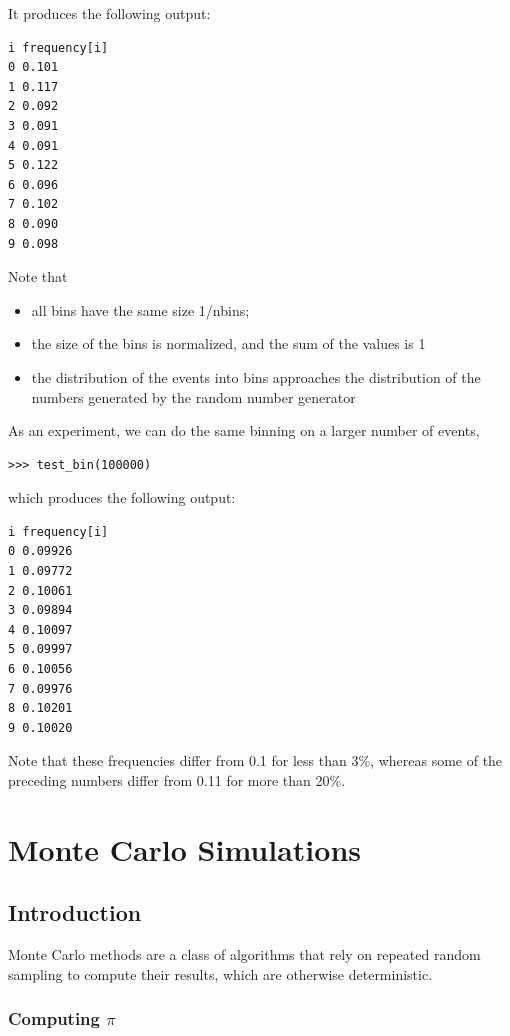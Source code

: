 \documentclass[justified, sixbynine]{tufte-book}
\theoremstyle{plain}%
\newtheorem * {corollary}{Corollary}
\theoremstyle{definition}
\theoremstyle{remark}
\newtheorem * {remark}{Remark}
\newtheorem * {note}{Note}
\begin{document}
\begin{fullwidth}
It produces the following output:
\begin{lstlisting}
i frequency[i]
0 0.101
1 0.117
2 0.092
3 0.091
4 0.091
5 0.122
6 0.096
7 0.102
8 0.090
9 0.098
\end{lstlisting}

Note that

\begin{itemize}
\item  all bins have the same size 1/nbins;

\item  the size of the bins is normalized, and the sum of the values is 1

\item  the distribution of the events into bins approaches the distribution
of the numbers generated by the random number generator
\end{itemize}

As an experiment, we can do the same binning on a larger number of events,
\begin{lstlisting}
>>> test_bin(100000)
\end{lstlisting}

which produces the following output:
\begin{lstlisting}
i frequency[i]
0 0.09926
1 0.09772
2 0.10061
3 0.09894
4 0.10097
5 0.09997
6 0.10056
7 0.09976
8 0.10201
9 0.10020
\end{lstlisting}

Note that these frequencies differ from 0.1 for less than 3\%, whereas some of
the preceding numbers differ from 0.11 for more than 20\%.

\chapter{Monte Carlo Simulations}

\goodbreak\section{Introduction}

Monte Carlo methods are a class of algorithms that rely on repeated random sampling to compute their results, which are otherwise deterministic.

\goodbreak\subsection{Computing $\pi$}


\end{fullwidth}
\end{document}
